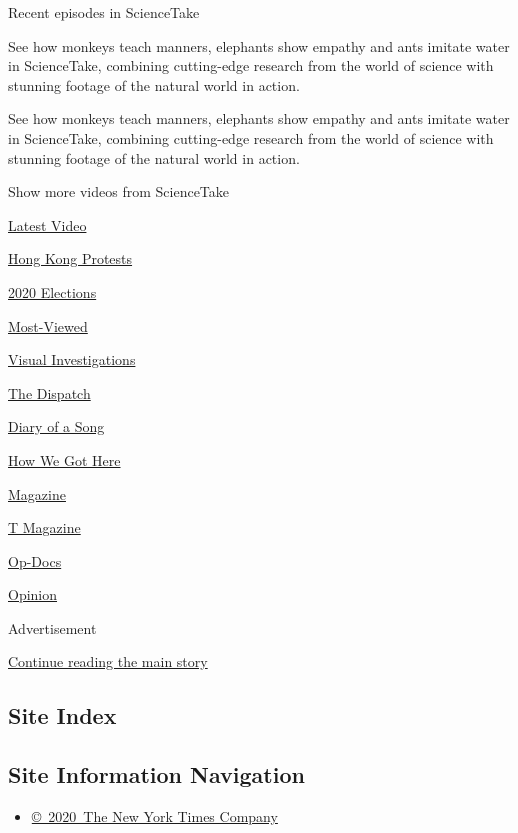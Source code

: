 Recent episodes in ScienceTake

See how monkeys teach manners, elephants show empathy and ants imitate
water in ScienceTake, combining cutting-edge research from the world of
science with stunning footage of the natural world in action.

See how monkeys teach manners, elephants show empathy and ants imitate
water in ScienceTake, combining cutting-edge research from the world of
science with stunning footage of the natural world in action.

Show more videos from ScienceTake

\href{/video}{}

\href{/video/latest-video}{Latest Video}

\href{/video/hk-protest}{Hong Kong Protests}

\href{/video/2020-Elections}{2020 Elections}

\href{/video/Most-Viewed}{Most-Viewed}

\href{/video/investigations}{Visual Investigations}

\href{/video/on-the-ground}{The Dispatch}

\href{/video/diaryofasong}{Diary of a Song}

\href{/video/how-we-got-here}{How We Got Here}

\href{/video/magazine}{Magazine}

\href{/video/t-magazine}{T Magazine}

\href{/video/op-docs}{Op-Docs}

\href{/video/opinion}{Opinion}

Advertisement

\protect\hyperlink{after-bottom}{Continue reading the main story}

\hypertarget{site-index}{%
\subsection{Site Index}\label{site-index}}

\hypertarget{site-information-navigation}{%
\subsection{Site Information
Navigation}\label{site-information-navigation}}

\begin{itemize}
\tightlist
\item
  \href{https://help.nytimes3xbfgragh.onion/hc/en-us/articles/115014792127-Copyright-notice}{©~2020~The
  New York Times Company}
\end{itemize}

